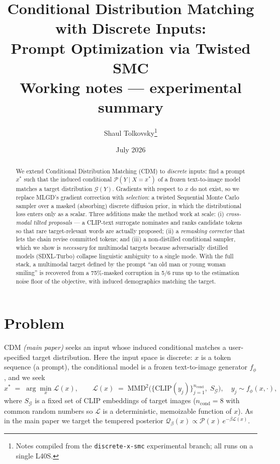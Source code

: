 \documentclass[11pt]{article}
\title{Conditional Distribution Matching with Discrete Inputs:\\
Prompt Optimization via Twisted SMC\\
\large Working notes --- experimental summary}
\author{Shaul Tolkovsky\thanks{Notes compiled from the
\texttt{discrete-x-smc} experimental branch; all runs on a single L40S.}}
\date{July 2026}
\newcommand{\G}{\mathcal{G}}
\newcommand{\Ploss}{\mathcal{L}}
\newcommand{\Pd}{\mathcal{P}}
\begin{document}
\maketitle

\begin{abstract}
We extend Conditional Distribution Matching (CDM) to \emph{discrete} inputs:
find a prompt $x^\ast$ such that the induced conditional
$\Pd(Y \mid X{=}x^\ast)$ of a frozen text-to-image model matches a target
distribution $\G(Y)$. Gradients with respect to $x$ do not exist, so we
replace MLGD's gradient correction with \emph{selection}: a twisted
Sequential Monte Carlo sampler over a masked (absorbing) discrete diffusion
prior, in which the distributional loss enters only as a scalar. Three
additions make the method work at scale: (i) \emph{cross-modal tilted
proposals} --- a CLIP-text surrogate nominates and ranks candidate tokens so
that rare target-relevant words are actually proposed; (ii) a
\emph{remasking corrector} that lets the chain revise committed tokens; and
(iii) a non-distilled conditional sampler, which we show is \emph{necessary}
for multimodal targets because adversarially distilled models (SDXL-Turbo)
collapse linguistic ambiguity to a single mode. With the full stack, a
multimodal target defined by the prompt ``an old man or young woman
smiling'' is recovered from a 75\%-masked corruption in 5/6 runs up to the
estimation noise floor of the objective, with induced demographics matching
the target.
\end{abstract}

\section{Problem}
CDM \emph{(main paper)} seeks an input whose induced conditional matches a
user-specified target distribution. Here the input space is discrete: $x$
is a token sequence (a prompt), the conditional model is a frozen
text-to-image generator $f_\phi$, and we seek
\begin{equation}
\label{eq:objective}
x^\ast \;=\; \arg\min_x \Ploss(x), \qquad
\Ploss(x) \;=\; \mathrm{MMD}^2\!\big( \{ \mathrm{CLIP}(y_j) \}_{j=1}^{n_{\mathrm{cond}}},\; S_\G \big),
\quad y_j \sim f_\phi(x, \cdot),
\end{equation}
where $S_\G$ is a fixed set of CLIP embeddings of target images
($n_{\mathrm{cond}}{=}8$ with common random numbers so $\Ploss$ is a
deterministic, memoizable function of $x$). As in the main paper we target
the tempered posterior
$\mathcal{Q}_\beta(x) \propto \Pd(x)\, e^{-\beta \Ploss(x)}$.
\end{document}
